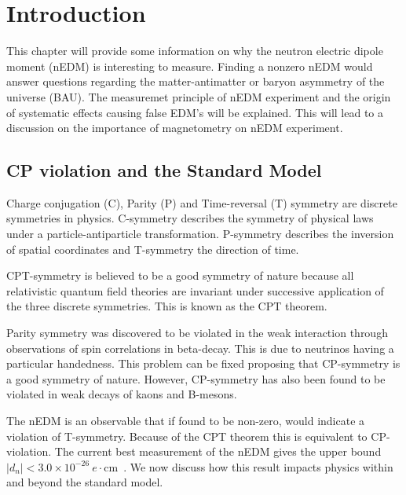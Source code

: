 \chapter{Introduction\label{ch:intro}}

This chapter will provide some information on why the neutron electric
dipole moment (nEDM) is interesting to measure.  Finding a nonzero
nEDM would answer questions regarding the matter-antimatter or baryon
asymmetry of the universe (BAU).  The measuremet principle of nEDM
experiment and the origin of systematic effects causing false EDM's
will be explained.  This will lead to a discussion on the importance
of magnetometry on nEDM experiment.

\section{CP violation and the Standard Model}

Charge conjugation (C), Parity (P) and Time-reversal (T) symmetry are
discrete symmetries in physics.  C-symmetry describes the symmetry of
physical laws under a particle-antiparticle transformation.
P-symmetry describes the inversion of spatial coordinates and
T-symmetry the direction of time.

CPT-symmetry is believed to be a good symmetry of nature because all
relativistic quantum field theories are invariant under successive
application of the three discrete symmetries.  This is known as the
CPT theorem.

Parity symmetry was discovered to be violated in the weak interaction
through observations of spin correlations in beta-decay.  This is due
to neutrinos having a particular handedness.  This problem can be
fixed proposing that CP-symmetry is a good symmetry of nature.
However, CP-symmetry has also been found to be violated in weak decays
of kaons and B-mesons.

The nEDM is an observable that if found to be non-zero, would indicate
a violation of T-symmetry.  Because of the CPT theorem this is
equivalent to CP-violation.  The current best measurement of the nEDM
gives the upper bound $|d_n|<3.0\times
10^{-26}~e\cdot$cm~\cite{PhysRevLett.97.131801,PhysRevD.92.092003}.
We now discuss how this result impacts physics within and beyond the
standard model.


